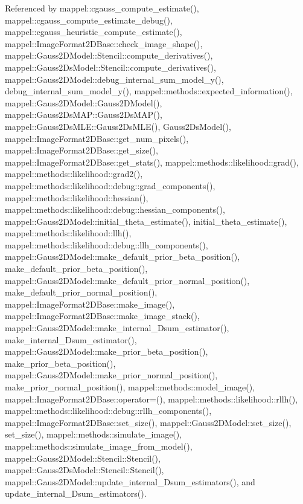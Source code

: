 Referenced by mappel\+::cgauss\+\_\+compute\+\_\+estimate(), mappel\+::cgauss\+\_\+compute\+\_\+estimate\+\_\+debug(), mappel\+::cgauss\+\_\+heuristic\+\_\+compute\+\_\+estimate(), mappel\+::\+Image\+Format2\+D\+Base\+::check\+\_\+image\+\_\+shape(), mappel\+::\+Gauss2\+D\+Model\+::\+Stencil\+::compute\+\_\+derivatives(), mappel\+::\+Gauss2\+Ds\+Model\+::\+Stencil\+::compute\+\_\+derivatives(), mappel\+::\+Gauss2\+D\+Model\+::debug\+\_\+internal\+\_\+sum\+\_\+model\+\_\+y(), debug\+\_\+internal\+\_\+sum\+\_\+model\+\_\+y(), mappel\+::methods\+::expected\+\_\+information(), mappel\+::\+Gauss2\+D\+Model\+::\+Gauss2\+D\+Model(), mappel\+::\+Gauss2\+Ds\+M\+A\+P\+::\+Gauss2\+Ds\+M\+A\+P(), mappel\+::\+Gauss2\+Ds\+M\+L\+E\+::\+Gauss2\+Ds\+M\+L\+E(), Gauss2\+Ds\+Model(), mappel\+::\+Image\+Format2\+D\+Base\+::get\+\_\+num\+\_\+pixels(), mappel\+::\+Image\+Format2\+D\+Base\+::get\+\_\+size(), mappel\+::\+Image\+Format2\+D\+Base\+::get\+\_\+stats(), mappel\+::methods\+::likelihood\+::grad(), mappel\+::methods\+::likelihood\+::grad2(), mappel\+::methods\+::likelihood\+::debug\+::grad\+\_\+components(), mappel\+::methods\+::likelihood\+::hessian(), mappel\+::methods\+::likelihood\+::debug\+::hessian\+\_\+components(), mappel\+::\+Gauss2\+D\+Model\+::initial\+\_\+theta\+\_\+estimate(), initial\+\_\+theta\+\_\+estimate(), mappel\+::methods\+::likelihood\+::llh(), mappel\+::methods\+::likelihood\+::debug\+::llh\+\_\+components(), mappel\+::\+Gauss2\+D\+Model\+::make\+\_\+default\+\_\+prior\+\_\+beta\+\_\+position(), make\+\_\+default\+\_\+prior\+\_\+beta\+\_\+position(), mappel\+::\+Gauss2\+D\+Model\+::make\+\_\+default\+\_\+prior\+\_\+normal\+\_\+position(), make\+\_\+default\+\_\+prior\+\_\+normal\+\_\+position(), mappel\+::\+Image\+Format2\+D\+Base\+::make\+\_\+image(), mappel\+::\+Image\+Format2\+D\+Base\+::make\+\_\+image\+\_\+stack(), mappel\+::\+Gauss2\+D\+Model\+::make\+\_\+internal\+\_\+Dsum\+\_\+estimator(), make\+\_\+internal\+\_\+Dsum\+\_\+estimator(), mappel\+::\+Gauss2\+D\+Model\+::make\+\_\+prior\+\_\+beta\+\_\+position(), make\+\_\+prior\+\_\+beta\+\_\+position(), mappel\+::\+Gauss2\+D\+Model\+::make\+\_\+prior\+\_\+normal\+\_\+position(), make\+\_\+prior\+\_\+normal\+\_\+position(), mappel\+::methods\+::model\+\_\+image(), mappel\+::\+Image\+Format2\+D\+Base\+::operator=(), mappel\+::methods\+::likelihood\+::rllh(), mappel\+::methods\+::likelihood\+::debug\+::rllh\+\_\+components(), mappel\+::\+Image\+Format2\+D\+Base\+::set\+\_\+size(), mappel\+::\+Gauss2\+D\+Model\+::set\+\_\+size(), set\+\_\+size(), mappel\+::methods\+::simulate\+\_\+image(), mappel\+::methods\+::simulate\+\_\+image\+\_\+from\+\_\+model(), mappel\+::\+Gauss2\+D\+Model\+::\+Stencil\+::\+Stencil(), mappel\+::\+Gauss2\+Ds\+Model\+::\+Stencil\+::\+Stencil(), mappel\+::\+Gauss2\+D\+Model\+::update\+\_\+internal\+\_\+Dsum\+\_\+estimators(), and update\+\_\+internal\+\_\+Dsum\+\_\+estimators().

